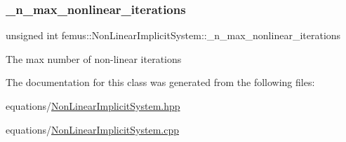 \mbox{\label{classfemus_1_1_non_linear_implicit_system_a42606b5212631b7d44f4fa82377a6a95}} 
\subsubsection{\texorpdfstring{\+\_\+n\+\_\+max\+\_\+nonlinear\+\_\+iterations}{\_n\_max\_nonlinear\_iterations}}
{\footnotesize\ttfamily unsigned int femus\+::\+Non\+Linear\+Implicit\+System\+::\+\_\+n\+\_\+max\+\_\+nonlinear\+\_\+iterations\hspace{0.3cm}{\ttfamily [protected]}}

The max number of non-\/linear iterations 

The documentation for this class was generated from the following files\+:\begin{DoxyCompactItemize}
\item 
equations/\mbox{\hyperlink{_non_linear_implicit_system_8hpp}{Non\+Linear\+Implicit\+System.\+hpp}}\item 
equations/\mbox{\hyperlink{_non_linear_implicit_system_8cpp}{Non\+Linear\+Implicit\+System.\+cpp}}\end{DoxyCompactItemize}
